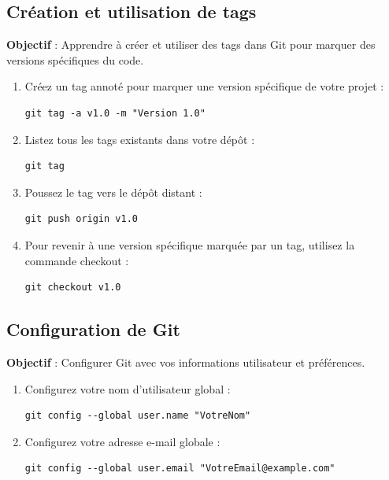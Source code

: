 \subsection*{Création et utilisation de tags}
{}
\noindent \textbf{Objectif} : Apprendre à créer et utiliser des tags dans Git pour marquer des versions spécifiques du code.

\begin{enumerate}
	\item Créez un tag annoté pour marquer une version spécifique de votre projet :
	\begin{verbatim}
git tag -a v1.0 -m "Version 1.0"
	\end{verbatim}
	\item Listez tous les tags existants dans votre dépôt :
	\begin{verbatim}
git tag
	\end{verbatim}
	\item Poussez le tag vers le dépôt distant :
	\begin{verbatim}
git push origin v1.0
	\end{verbatim}
	\item Pour revenir à une version spécifique marquée par un tag, utilisez la commande checkout :
	\begin{verbatim}
git checkout v1.0
	\end{verbatim}
\end{enumerate}

\newpage

\subsection*{Configuration de Git}
{}
\noindent \textbf{Objectif} : Configurer Git avec vos informations utilisateur et préférences.
\begin{enumerate}
	\item Configurez votre nom d'utilisateur global :
	\begin{verbatim}
git config --global user.name "VotreNom"
	\end{verbatim}
	\item Configurez votre adresse e-mail globale :
	\begin{verbatim}
git config --global user.email "VotreEmail@example.com"
	\end{verbatim}
\end{enumerate}


